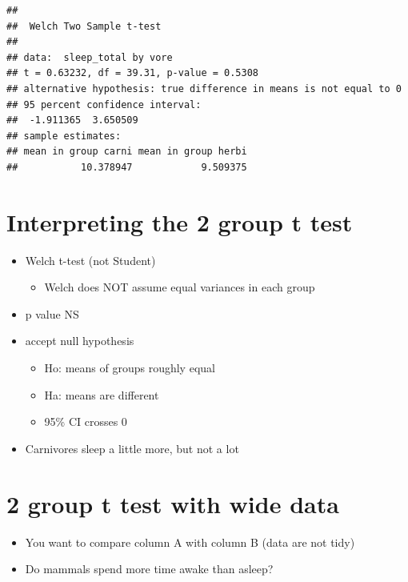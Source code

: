 \documentclass[
]{book}
\providecommand{\tightlist}{%
  \setlength{\itemsep}{0pt}\setlength{\parskip}{0pt}}
\begin{document}
\begin{verbatim}
## 
##  Welch Two Sample t-test
## 
## data:  sleep_total by vore
## t = 0.63232, df = 39.31, p-value = 0.5308
## alternative hypothesis: true difference in means is not equal to 0
## 95 percent confidence interval:
##  -1.911365  3.650509
## sample estimates:
## mean in group carni mean in group herbi 
##           10.378947            9.509375
\end{verbatim}

\hypertarget{interpreting-the-2-group-t-test}{%
\section{Interpreting the 2 group t test}\label{interpreting-the-2-group-t-test}}

\begin{itemize}
\tightlist
\item
  Welch t-test (not Student)

  \begin{itemize}
  \tightlist
  \item
    Welch does NOT assume equal variances in each group
  \end{itemize}
\item
  p value NS
\item
  accept null hypothesis

  \begin{itemize}
  \tightlist
  \item
    Ho: means of groups roughly equal
  \item
    Ha: means are different
  \item
    95\% CI crosses 0
  \end{itemize}
\item
  Carnivores sleep a little more, but not a lot
\end{itemize}

\hypertarget{group-t-test-with-wide-data}{%
\section{2 group t test with wide data}\label{group-t-test-with-wide-data}}

\begin{itemize}
\tightlist
\item
  You want to compare column A with column B (data are not tidy)
\item
  Do mammals spend more time awake than asleep?
\end{itemize}
\end{document}
